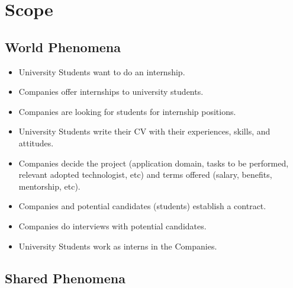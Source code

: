 \section{Scope}
\subsection{World Phenomena}

\begin{itemize}

    \item[\text{[WP1]}] University Students want to do an internship.

    \item[\text{[WP2]}] Companies offer internships to university students.

    \item[\text{[WP3]}] Companies are looking for students for internship positions.

    \item[\text{[WP4]}] University Students write their CV with their experiences, skills, and attitudes.

    \item[\text{[WP5]}] Companies decide the project (application domain, tasks to be performed, relevant adopted technologist, etc) and terms offered (salary, benefits, mentorship, etc).

    \item[\text{[WP6]}] Companies and potential candidates (students) establish a contract.

    \item[\text{[WP7]}] Companies do interviews with potential candidates.

    \item[\text{[WP8]}] University Students work as interns in the Companies.
    
\end{itemize}

\subsection{Shared Phenomena}

